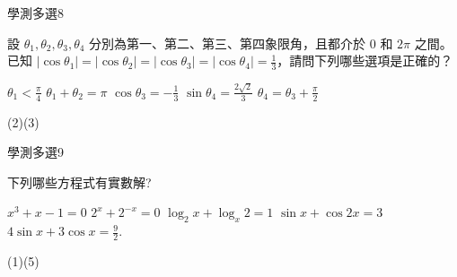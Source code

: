     \begin{QUESTION}
        \begin{ExamInfo}{99}{學測}{多選}{8}
        \end{ExamInfo}
        \begin{ExamAnsRateInfo}{39}{72}{29}{16}
        \end{ExamAnsRateInfo}
        \begin{QBODY}
            設 $\theta_1,\theta_2,\theta_3,\theta_4$ 分別為第一、第二、第三、第四象限角，且都介於 $0$ 和  $2\pi$ 之間。已知 $|\cos \theta_{1}| =|\cos \theta_{2}| =|\cos \theta_{3}| =|\cos \theta_{4}| =\frac{1}{3}$，請問下列哪些選項是正確的？
			\begin{QOPS} 
				\QOP $\theta_{1} < \frac{\pi}{4}$ 
				\QOP $\theta_{1} + \theta_{2} = \pi$
				\QOP $ \cos \theta_{3}  =-\frac{1}{3}$ 
				\QOP $\sin\theta_{4} = \frac{2\sqrt{2}}{3}$
				\QOP $\theta_{4} = \theta_{3} + \frac{\pi}{2}$ 
			\end{QOPS}
        \end{QBODY}
        \begin{QFROMS}
        \end{QFROMS}
        \begin{QTAGS}\end{QTAGS}
        \begin{QANS}
            (2)(3)
        \end{QANS}
        \begin{QSOLLIST}
        \end{QSOLLIST}
        \begin{QEMPTYSPACE}
        \end{QEMPTYSPACE}
    \end{QUESTION}
    \begin{QUESTION}
        \begin{ExamInfo}{99}{學測}{多選}{9}
        \end{ExamInfo}
        \begin{ExamAnsRateInfo}{24}{50}{14}{8}
        \end{ExamAnsRateInfo}
        \begin{QBODY}
            下列哪些方程式有實數解?
			\begin{QOPS} 
				\QOP $x^3 +x -1=0$ 
				\QOP $2^x +2^{-x} =0$ 
				\QOP $\log_2 x+ \log_x 2=1$ 
				\QOP $\sin{x}+ \cos{2x}=3$
				\QOP $4\sin{x}+3\cos{x}=\frac{9}{2}$.
			\end{QOPS}
        \end{QBODY}
        \begin{QFROMS}
        \end{QFROMS}
        \begin{QTAGS}\end{QTAGS}
        \begin{QANS}
            (1)(5)
        \end{QANS}
        \begin{QSOLLIST}
        \end{QSOLLIST}
        \begin{QEMPTYSPACE}
        \end{QEMPTYSPACE}
    \end{QUESTION}
